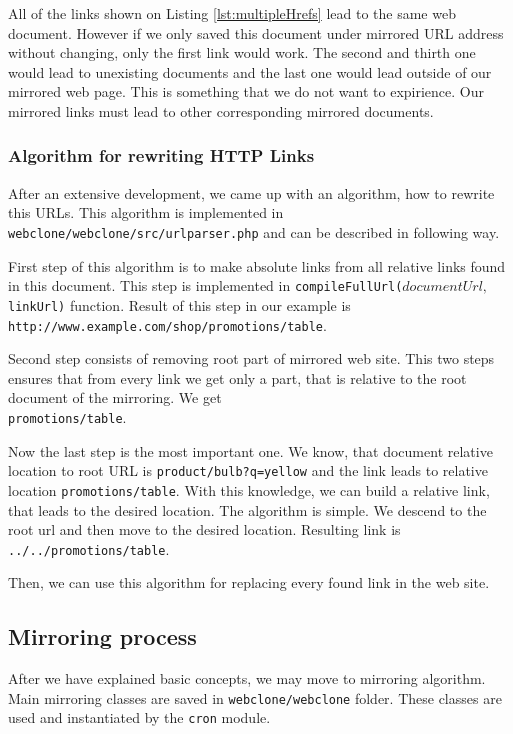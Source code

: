 All of the links shown on Listing \ref{lst:multipleHrefs} lead to the same web document. However if we only saved this document under mirrored URL address without changing, only the first link would work. The second and thirth one would lead to unexisting documents and the last one would lead outside of our mirrored web page. This is something that we do not want to expirience. Our mirrored links must lead to other corresponding mirrored documents.

\subsubsection{Algorithm for rewriting HTTP Links}
After an extensive development, we came up with an algorithm, how to rewrite this URLs. This algorithm is implemented in \texttt{webclone/webclone/src/urlparser.php} and can be described in following way.

First step of this algorithm is to make absolute links from all relative links found in this document. This step is implemented in \texttt{compileFullUrl($documentUrl, $linkUrl)} function. Result of this step in our example is \\ \texttt{http://www.example.com/shop/promotions/table}.

Second step consists of removing root part of mirrored web site. This two steps ensures that from every link we get only a part, that is relative to the root document of the mirroring. We get \\ \texttt{promotions/table}.

Now the last step is the most important one. We know, that document relative location to root URL is \texttt{product/bulb?q=yellow} and the link leads to relative location \texttt{promotions/table}. With this knowledge, we can build a relative link, that leads to the desired location. The algorithm is simple. We descend to the root url and then move to the desired location. Resulting link is \texttt{../../promotions/table}. 

Then, we can use this algorithm for replacing every found link in the web site.

\subsection{Mirroring process}
After we have explained basic concepts, we may move to mirroring algorithm. Main mirroring classes are saved in \texttt{webclone/webclone} folder. These classes are used and instantiated by the \texttt{cron} module.

